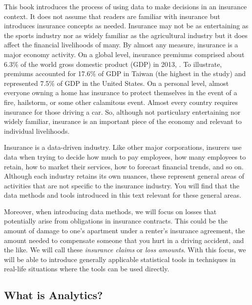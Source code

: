 \documentclass[]{book}
\begin{document}
This book introduces the process of using data to make decisions in an
insurance context. It does not assume that readers are familiar with
insurance but introduces insurance concepts as needed. Insurance may not
be as entertaining as the sports industry nor as widely familiar as the
agricultural industry but it does affect the financial livelihoods of
many. By almost any measure, insurance is a major economy activity. On a
global level, insurance premiums comprised about 6.3\% of the world
gross domestic product (GDP) in 2013, \citep{III2015}. To illustrate,
premiums accounted for 17.6\% of GDP in Taiwan (the highest in the
study) and represented 7.5\% of GDP in the United States. On a personal
level, almost everyone owning a home has insurance to protect themselves
in the event of a fire, hailstorm, or some other calamitous event.
Almost every country requires insurance for those driving a car. So,
although not particulary entertaining nor widely familiar, insurance is
an important piece of the economy and relevant to individual
livelihoods.

Insurance is a data-driven industry. Like other major corporations,
insurers use data when trying to decide how much to pay employees, how
many employees to retain, how to market their services, how to forecast
financial trends, and so on. Although each industry retains its own
nuances, these represent general areas of activities that are not
specific to the insurance industry. You will find that the data methods
and tools introduced in this text relevant for these general areas.

Moreover, when introducing data methods, we will focus on losses that
potentially arise from obligations in insurance contracts. This could be
the amount of damage to one's apartment under a renter's insurance
agreement, the amount needed to compensate someone that you hurt in a
driving accident, and the like. We will call these \emph{insurance
claims} or \emph{loss amounts}. With this focus, we will be able to
introduce generally applicable statistical tools in techniques in
real-life situations where the tools can be used directly.

\subsection{What is Analytics?}\label{what-is-analytics}
\end{document}
